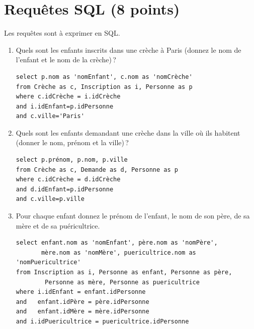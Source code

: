 \section{Requêtes SQL (8 points)}

Les requêtes sont à exprimer en SQL. 

\begin{enumerate}

  
  \item Quels sont les enfants inscrits dans une crèche à Paris (donnez le nom de l'enfant
      et le nom de la crèche)\,?

\begin{solution}
\begin{small}
\begin{verbatim}
select p.nom as 'nomEnfant', c.nom as 'nomCrèche'
from Crèche as c, Inscription as i, Personne as p
where c.idCrèche = i.idCrèche
and i.idEnfant=p.idPersonne
and c.ville='Paris'
\end{verbatim}
\end{small}
\end{solution}
  \item Quels sont les enfants demandant une crèche dans la ville où ils habitent
  (donner le nom, prénom et la ville)\,?
  
\begin{solution}
\begin{small}
\begin{verbatim}
select p.prénom, p.nom, p.ville
from Crèche as c, Demande as d, Personne as p
where c.idCrèche = d.idCrèche
and d.idEnfant=p.idPersonne
and c.ville=p.ville
\end{verbatim}
\end{small}
\end{solution}

  \item Pour chaque enfant donnez le prénom de l'enfant, le nom de son père, de sa mère
  et de sa puéricultrice.

\begin{solution}
\begin{small}
\begin{verbatim}
select enfant.nom as 'nomEnfant', père.nom as 'nomPère',
       mère.nom as 'nomMère', puericultrice.nom as 'nomPuericultrice'
from Inscription as i, Personne as enfant, Personne as père, 
        Personne as mère, Personne as puericultrice
where i.idEnfant = enfant.idPersonne
and   enfant.idPère = père.idPersonne
and   enfant.idMère = mère.idPersonne
and i.idPuericultrice = puericultrice.idPersonne
\end{verbatim}
\end{small}
\end{solution}


\end{enumerate}
